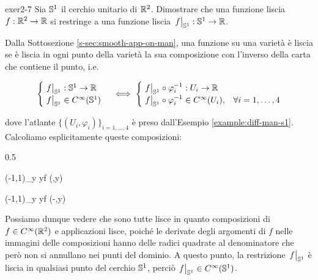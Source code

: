 
{exer2-7}
{
Sia $ \S^{1} $ il cerchio unitario di $ \R^{2} $. Dimostrare che una funzione liscia $ f : \R^{2} \to \R $ si restringe a una funzione liscia $ \eval{f}_{\S^{1}} : \S^{1} \to \R $.
}
{
Dalla Sottosezione \ref{s-sec:smooth-app-on-man}, una funzione su una varietà è liscia se è liscia in ogni punto della varietà la sua composizione con l'inverso della carta che contiene il punto, i.e.

\begin{equation}
	\begin{cases}
		\eval{f}_{\S^{1}} : \S^{1} \to \R \\
		\eval{f}_{\S^{1}} \in C^{\infty}(\S^{1})
	\end{cases} %
	\iff %
	\begin{cases}
		\eval{f}_{\S^{1}} \circ \varphi_{i}^{-1} : U_{i} \to \R \\
		\eval{f}_{\S^{1}} \circ \varphi_{i}^{-1} \in C^{\infty}(U_{i}), & \forall i=1,\dots,4
	\end{cases}
\end{equation}

dove l'atlante $ \{(U_{i},\varphi_{i})\}_{i=1,\dots,4} $ è preso dall'Esempio \ref{example:diff-man-s1}. \\
Calcoliamo esplicitamente queste composizioni:

	{0.5}{%
				{(-1,1)_{y}}{\R}
				{y}{f (,y)}
			
				{(-1,1)_{y}}{\R}
				{y}{f (-,y)}
			}

Possiamo dunque vedere che sono tutte lisce in quanto composizioni di $ f \in C^{\infty}(\R^{2}) $ e applicazioni lisce, poiché le derivate degli argomenti di $ f $ nelle immagini delle composizioni hanno delle radici quadrate al denominatore che però non si annullano nei punti del dominio. A questo punto, la restrizione $ \eval{f}_{\S^{1}} $ è liscia in qualsiasi punto del cerchio $ \S^{1} $, perciò $ \eval{f}_{\S^{1}} \in C^{\infty}(\S^{1}) $.

}
